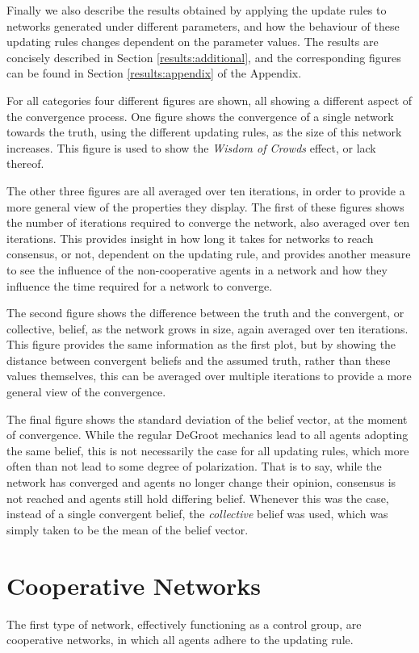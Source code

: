 \documentclass[a4paper, 12pt]{report}
\begin{document}
Finally we also describe the results obtained by applying the update rules to networks generated under different parameters, and how the behaviour of these updating rules changes dependent on the parameter values. The results are concisely described in Section \ref{results:additional}, and the corresponding figures can be found in Section \ref{results:appendix} of the Appendix.

For all categories four different figures are shown, all showing a different aspect of the convergence process. One figure shows the convergence of a single network towards the truth, using the different updating rules, as the size of this network increases. This figure is used to show the \emph{Wisdom of Crowds} effect, or lack thereof. 

The other three figures are all averaged over ten iterations, in order to provide a more general view of the properties they display. The first of these figures shows the number of iterations required to converge the network, also averaged over ten iterations. This provides insight in how long it takes for networks to reach consensus, or not, dependent on the updating rule, and provides another measure to see the influence of the non-cooperative agents in a network and how they influence the time required for a network to converge.

The second figure shows the difference between the truth and the convergent, or collective, belief, as the network grows in size, again averaged over ten iterations. This figure provides the same information as the first plot, but by showing the distance between convergent beliefs and the assumed truth, rather than these values themselves, this can be averaged over multiple iterations to provide a more general view of the convergence.

The final figure shows the standard deviation of the belief vector, at the moment of convergence. While the regular DeGroot mechanics lead to all agents adopting the same belief, this is not necessarily the case for all updating rules, which more often than not lead to some degree of polarization. That is to say, while the network has converged and agents no longer change their opinion, consensus is not reached and agents still hold differing belief. Whenever this was the case, instead of a single convergent belief, the \emph{collective} belief was used, which was simply taken to be the mean of the belief vector.

\newpage

\section{Cooperative Networks}
\label{results:coop}
The first type of network, effectively functioning as a control group, are cooperative networks, in which all agents adhere to the updating rule. 
\end{document}
